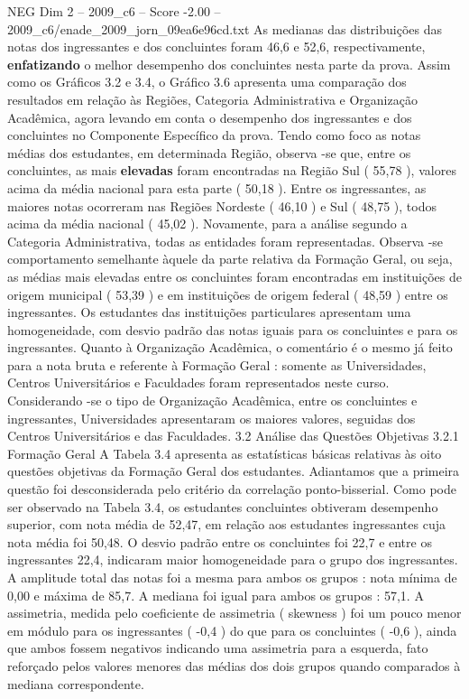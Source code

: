 \begin{textsample}{NEG Dim 2 – 2009\_c6 – Score -2.00 – 2009\_c6/enade\_2009\_jorn\_09ea6e96cd.txt}
As medianas das distribuições das notas dos ingressantes e dos concluintes foram 46,6 e 52,6, respectivamente, \textbf{enfatizando} o melhor desempenho dos concluintes nesta parte da prova.
Assim como os Gráficos 3.2 e 3.4, o Gráfico 3.6 apresenta uma comparação dos resultados em relação às Regiões, Categoria Administrativa e Organização Acadêmica, agora levando em conta o desempenho dos ingressantes e dos concluintes no Componente Específico da prova.
Tendo como foco as notas médias dos estudantes, em determinada Região, observa -se que, entre os concluintes, as mais \textbf{elevadas} foram encontradas na Região Sul ( 55,78 ), valores acima da média nacional para esta parte ( 50,18 ).
Entre os ingressantes, as maiores notas ocorreram nas Regiões Nordeste ( 46,10 ) e Sul ( 48,75 ), todos acima da média nacional ( 45,02 ).
Novamente, para a análise segundo a Categoria Administrativa, todas as entidades foram representadas.
Observa -se comportamento semelhante àquele da parte relativa da Formação Geral, ou seja, as médias mais elevadas entre os concluintes foram encontradas em instituições de origem municipal ( 53,39 ) e em instituições de origem federal ( 48,59 ) entre os ingressantes.
Os estudantes das instituições particulares apresentam uma homogeneidade, com desvio padrão das notas iguais para os concluintes e para os ingressantes.
Quanto à Organização Acadêmica, o comentário é o mesmo já feito para a nota bruta e referente à Formação Geral : somente as Universidades, Centros Universitários e Faculdades foram representados neste curso.
Considerando -se o tipo de Organização Acadêmica, entre os concluintes e ingressantes, Universidades apresentaram os maiores valores, seguidas dos Centros Universitários e das Faculdades. 3.2 Análise das Questões Objetivas 3.2.1 Formação Geral A Tabela 3.4 apresenta as estatísticas básicas relativas às oito questões objetivas da Formação Geral dos estudantes.
Adiantamos que a primeira questão foi desconsiderada pelo critério da correlação ponto-bisserial.
Como pode ser observado na Tabela 3.4, os estudantes concluintes obtiveram desempenho superior, com nota média de 52,47, em relação aos estudantes ingressantes cuja nota média foi 50,48.
O desvio padrão entre os concluintes foi 22,7 e entre os ingressantes 22,4, indicaram maior homogeneidade para o grupo dos ingressantes.
A amplitude total das notas foi a mesma para ambos os grupos : nota mínima de 0,00 e máxima de 85,7.
A mediana foi igual para ambos os grupos : 57,1.
A assimetria, medida pelo coeficiente de assimetria ( skewness ) foi um pouco menor em módulo para os ingressantes ( -0,4 ) do que para os concluintes ( -0,6 ), ainda que ambos fossem negativos indicando uma assimetria para a esquerda, fato reforçado pelos valores menores das médias dos dois grupos quando comparados à mediana correspondente.

\end{textsample}
